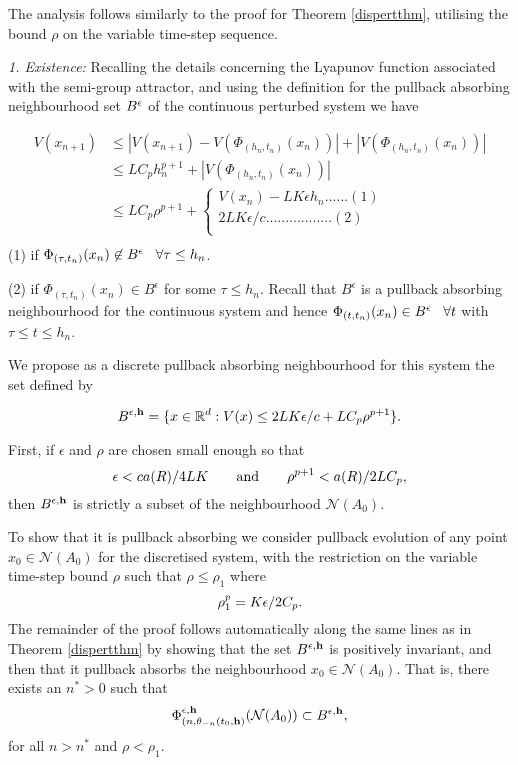 \begin{prf}
The analysis follows similarly to the proof for Theorem \ref{dispertthm},
utilising the bound $\rho$ on the variable time-step sequence.

{\em 1. Existence: }
Recalling the details concerning the Lyapunov function associated with the
semi-group attractor, and using the definition for the pullback absorbing
neighbourhood set $B^{\epsilon}$ of the continuous perturbed system we have

\begin{align*}
  V(x_{n+1}) & \leq |V(x_{n+1}) -
           V(\Phi_{(h_n,t_n)}(x_n))| + |V(\Phi_{(h_n,t_n)}(x_n))| \\
  & \leq LC_{p}h_n^{p+1} + |V(\Phi_{(h_n,t_n)}(x_n))| \\
  & \leq LC_{p}\rho^{p+1} +  \left\{ \begin{array}{c}
           V(x_{n}) - LK \epsilon h_n ......(1) \\
           2LK\epsilon /c .................(2) \\
           \end{array} \right.  \\
\end{align*}
(1) if $\Phi_{(\tau,t_n)}(x_n) \not\in B^{\epsilon} \hspace{3mm} \forall
\tau \leq h_n$.

(2) if $\Phi_{(\tau,t_n)}(x_n) \in B^{\epsilon}$ for some $\tau
\leq h_n$. Recall that $B^{\epsilon}$ is a pullback absorbing
neighbourhood for the continuous system and hence $\Phi_{(t,t_{n})}(x_{n})
\in B^{\epsilon} \hspace{3mm} \forall t$ with $\tau \leq t \leq h_n$.

We propose as a discrete pullback absorbing neighbourhood for this
system the set defined by

  \[ B^{\epsilon,{\bf h}} = \{x \in \mathbb{R}^{d} : V(x) \leq 2LK \epsilon /c +
                    LC_{p}\rho^{p+1} \}. \]

  First, if $\epsilon$ and $\rho$ are chosen small enough so that
  \begin{equation}\label{eqerlimits}
    \epsilon < c a(R) / 4LK \qquad \text{and} \qquad  \rho^{p+1} <  a(R) / 2LC_p,
  \end{equation}
  then $B^{\epsilon,{\bf h}}$ is strictly a subset of the neighbourhood
  $\mathcal{N}(A_0)$.

To show that it is pullback absorbing we consider pullback evolution of any
point $x_0 \in \mathcal{N}(A_0)$ for the discretised system, with the
restriction on the variable time-step bound $\rho$ such that $\rho \leq \rho_1$
where
\[ \rho_1^p = K \epsilon / 2C_p. \]
The remainder of the proof follows automatically along the same lines as in
Theorem \ref{dispertthm} by showing that the set  $B^{\epsilon,{\bf h}}$
is positively invariant, and then that it pullback absorbs the neighbourhood
$x_0 \in \mathcal{N}(A_0)$. That is, there exists an $n^* > 0$ such that
  \[ \Phi^{\epsilon,{\bf h}}_{(n,\theta_{-n}(t_0, {\bf h})}(\mathcal{N}(A_0)) \subset
  B^{\epsilon,{\bf h}}, \]
for all $n > n^*$ and $\rho < \rho_1$.


\end{prf}

